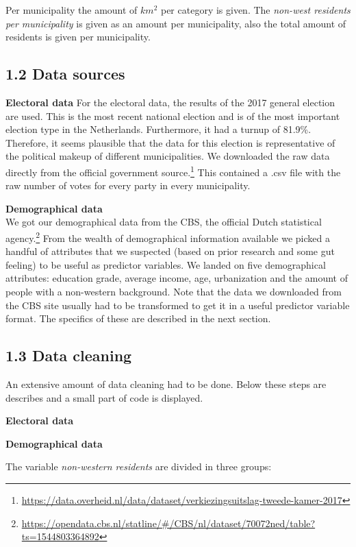 \documentclass[11pt,]{article}
\let\rmarkdownfootnote\footnote%
\def\footnote{\protect\rmarkdownfootnote}
\begin{document}
Per municipality the amount of \(km^2\) per category is given. The
\emph{non-west residents per municipality} is given as an amount per
municipality, also the total amount of residents is given per
municipality.

\subsection{1.2 Data sources}\label{data-sources}

\textbf{Electoral data} For the electoral data, the results of the 2017
general election are used. This is the most recent national election and
is of the most important election type in the Netherlands. Furthermore,
it had a turnup of 81.9\%. Therefore, it seems plausible that the data
for this election is representative of the political makeup of different
municipalities. We downloaded the raw data directly from the official
government source.\footnote{\url{https://data.overheid.nl/data/dataset/verkiezingsuitslag-tweede-kamer-2017}}
This contained a .csv file with the raw number of votes for every party
in every municipality.

\textbf{Demographical data}\\
We got our demographical data from the CBS, the official Dutch
statistical agency.\footnote{\url{https://opendata.cbs.nl/statline/\#/CBS/nl/dataset/70072ned/table?ts=1544803364892}}
From the wealth of demographical information available we picked a
handful of attributes that we suspected (based on prior research and
some gut feeling) to be useful as predictor variables. We landed on five
demographical attributes: education grade, average income, age,
urbanization and the amount of people with a non-western background.
Note that the data we downloaded from the CBS site usually had to be
transformed to get it in a useful predictor variable format. The
specifics of these are described in the next section.

\subsection{1.3 Data cleaning}\label{data-cleaning}

An extensive amount of data cleaning had to be done. Below these steps
are describes and a small part of code is displayed.

\textbf{Electoral data}

\textbf{Demographical data}

The variable \emph{non-western residents} are divided in three groups:
\end{document}
